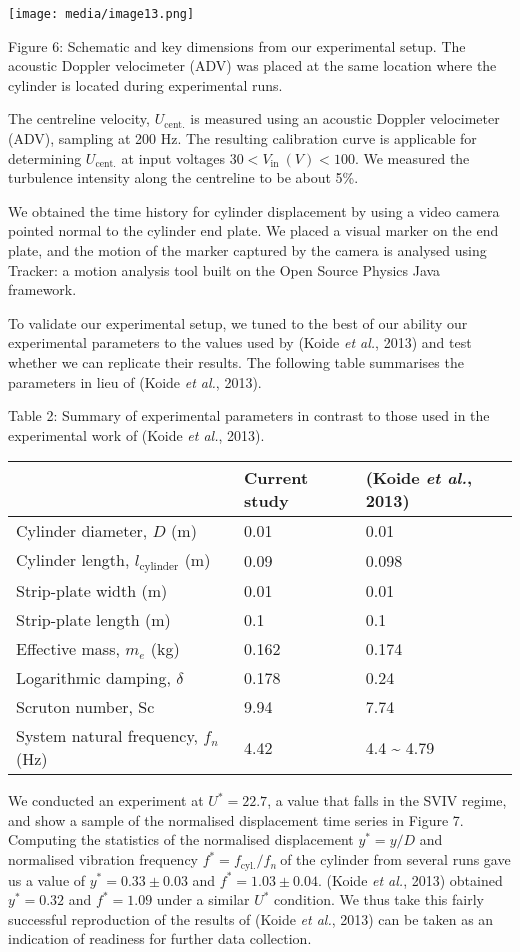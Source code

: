 \documentclass[]{article}
\begin{document}
\texttt{[image: media/image13.png]}

\protect\hypertarget{_Ref40996269}{}{\protect\hypertarget{_Toc41048829}{}{}}Figure
6: Schematic and key dimensions from our experimental setup. The
acoustic Doppler velocimeter (ADV) was placed at the same location where
the cylinder is located during experimental runs.

The centreline velocity, \(U_{\text{cent.}}\) is measured using an
acoustic Doppler velocimeter (ADV), sampling at 200 Hz. The resulting
calibration curve is applicable for determining \(U_{\text{cent.}}\) at
input voltages \({30 < V}_{\text{in}}\ (V) < 100\). We measured the
turbulence intensity along the centreline to be about 5\%.

We obtained the time history for cylinder displacement by using a video
camera pointed normal to the cylinder end plate. We placed a visual
marker on the end plate, and the motion of the marker captured by the
camera is analysed using Tracker: a motion analysis tool built on the
Open Source Physics Java framework.

To validate our experimental setup, we tuned to the best of our ability
our experimental parameters to the values used by (Koide \emph{et al.},
2013) and test whether we can replicate their results. The following
table summarises the parameters in lieu of (Koide \emph{et al.}, 2013).

Table 2: Summary of experimental parameters in contrast to those used in
the experimental work of (Koide \emph{et al.}, 2013).

\begin{longtable}[]{@{}lll@{}}
\toprule
& Current study & (Koide \emph{et al.}, 2013)\tabularnewline
\midrule
\endhead
Cylinder diameter, \(D\) (m) & 0.01 & 0.01\tabularnewline
Cylinder length, \(l_{\text{cylinder}}\) (m) & 0.09 &
0.098\tabularnewline
Strip-plate width (m) & 0.01 & 0.01\tabularnewline
Strip-plate length (m) & 0.1 & 0.1\tabularnewline
Effective mass, \(m_{e}\) (kg) & 0.162 & 0.174\tabularnewline
Logarithmic damping, \(\delta\) & 0.178 & 0.24\tabularnewline
Scruton number, Sc & 9.94 & 7.74\tabularnewline
System natural frequency, \(f_{n}\) (Hz) & 4.42 & 4.4 \textasciitilde{}
4.79\tabularnewline
\bottomrule
\end{longtable}

We conducted an experiment at \(U^{*} = 22.7\), a value that falls in
the SVIV regime, and show a sample of the normalised displacement time
series in Figure 7. Computing the statistics of the normalised
displacement \(y^{*} = y/D\) and normalised vibration frequency
\(f^{*} = f_{\text{cyl.}}/f_{n}\ \)of the cylinder from several runs
gave us a value of \(y^{*} = 0.33 \pm 0.03\) and
\(f^{*} = 1.03 \pm 0.04\). (Koide \emph{et al.}, 2013) obtained
\(y^{*} = 0.32\) and \(f^{*} = 1.09\) under a similar \(U^{*}\)
condition. We thus take this fairly successful reproduction of the
results of (Koide \emph{et al.}, 2013) can be taken as an indication of
readiness for further data collection.
\end{document}
